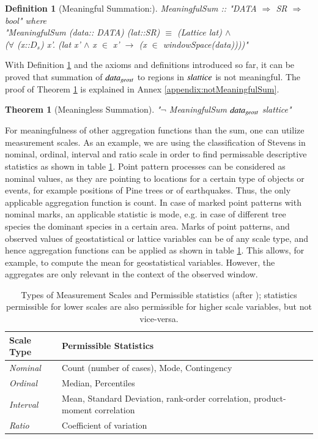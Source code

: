 \documentclass[final,authoryear,1p,times]{elsarticle}
\newtheorem{definition}{Definition}
\newtheorem{theorem}{Theorem}
\begin{document}
\begin{definition}[Meaningful Summation:]  
	MeaningfulSum :: "DATA $\Rightarrow$ SR $\Rightarrow$ bool" where\\
"MeaningfulSum (data:: DATA) (lat::SR) $\equiv$ (Lattice lat)  $\wedge$ \\
($\forall$ (x::$D_s$) x'. (lat x' $\wedge$ x $\in$ x'   $\rightarrow$ (x $\in$ windowSpace(data))))"
\label{def:meaningfulSum}
\end{definition}

With Definition \ref{def:meaningfulSum} and the axioms and definitions introduced so far, it can be proved that summation of ${\it data_{geost}}$ to regions in ${\it slattice}$ is not meaningful. The proof of Theorem \ref{the:notMeaningfulSum} is explained in Annex \ref{appendix:notMeaningfulSum}.
\begin{theorem}[Meaningless Summation]
\label{the:notMeaningfulSum}
"$\neg$ MeaningfulSum ${\it data_{geost}}$ slattice"
\end{theorem}
 
For meaningfulness of other aggregation functions than the sum, one can utilize measurement scales. As an example, we are using the classification of Stevens \citep{Stevens1946} in nominal, ordinal, interval and ratio scale in order to find permissable descriptive statistics as shown in table \ref{measScalesTable}. Point pattern processes can be considered as nominal values, as they are pointing to locations for a certain type of objects or events, for example positions of Pine trees or of earthquakes. Thus, the only applicable aggregation function is count. In case of marked point patterns with nominal marks, an applicable statistic is mode, e.g. in case of different tree species the dominant species in a certain area. Marks of point patterns, and observed values of geostatistical or lattice variables can be of any scale type, and hence aggregation functions can be applied as shown in table \ref{measScalesTable}. This allows, for example, to compute the mean for geostatistical variables. However, the aggregates are only relevant in the context of the observed window.

\begin{table}
\caption{Types of Measurement Scales and Permissible statistics (after \citep{Stevens1946});
statistics permissible for lower scales are also permissible for higher scale variables, but not vice-versa.}
\label{measScalesTable}
\begin{tabular}[h]{|p{3cm}|p{9cm}|}
			\hline
			\textbf{Scale Type} & \textbf{Permissible Statistics} \\
			\hline
			\textit{Nominal} & Count (number of cases), Mode, Contingency \\
			  \hline
			  \textit{Ordinal} & Median, Percentiles \\
			  \hline
			  \textit{Interval} & Mean, Standard Deviation, rank-order correlation, product-moment correlation \\
			  \hline
			  \textit{Ratio} & Coefficient of variation \\
			  \hline
\end{tabular}
\end{table}
\end{document}
